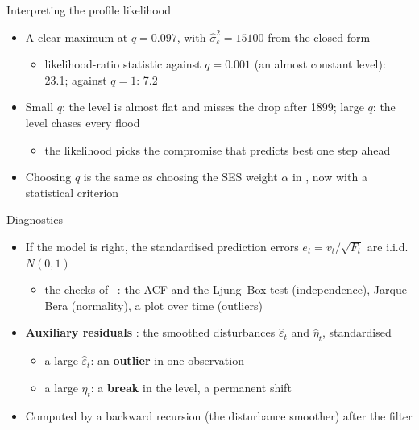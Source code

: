 \begin{frame}{Interpreting the profile likelihood}
\itemsize{\small}
\begin{itemize}
    \item A clear maximum at $\hat q = 0.097$, with $\hat\sigma^2_\varepsilon = 15100$ from the closed form
    \begin{itemize}
        \item likelihood-ratio statistic against $q = 0.001$ (an almost constant level): 23.1; against $q = 1$: 7.2
    \end{itemize}
    \item Small $q$: the level is almost flat and misses the drop after 1899; large $q$: the level chases every flood
    \begin{itemize}
        \item the likelihood picks the compromise that predicts best one step ahead
    \end{itemize}
    \item Choosing $q$ is the same as choosing the SES weight $\alpha$ in , now with a statistical criterion
\end{itemize}
\end{frame}

\begin{frame}{Diagnostics}
\itemsize{\small}
\begin{itemize}
    \item If the model is right, the standardised prediction errors $e_t = v_t/\sqrt{F_t}$ are i.i.d. $N(0, 1)$
    \begin{itemize}
        \item the checks of --: the ACF and the Ljung--Box test (independence), Jarque--Bera (normality), a plot over time (outliers)
    \end{itemize}
    \item \textbf{Auxiliary residuals} : the smoothed disturbances $\hat\varepsilon_t$ and $\hat\eta_t$, standardised
    \begin{itemize}
        \item a large $\hat\varepsilon_t$: an \textbf{outlier} in one observation
        \item a large $\hat\eta_t$: a \textbf{break} in the level, a permanent shift
    \end{itemize}
    \item Computed by a backward recursion (the disturbance smoother) after the filter
\end{itemize}
\end{frame}

